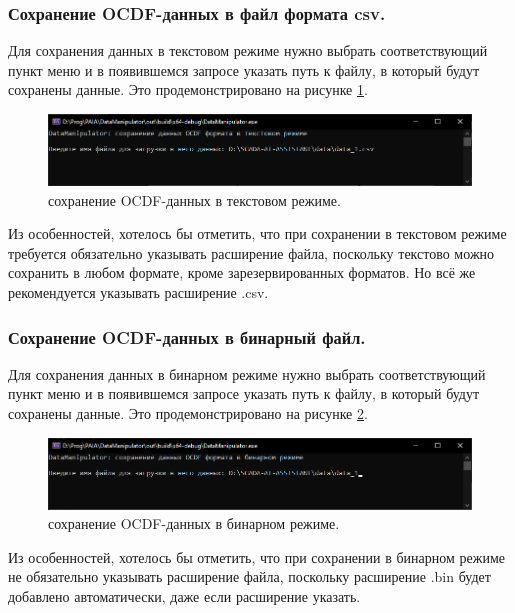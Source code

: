 \subsubsection{ \standartTitleFont
  Сохранение OCDF-данных в файл формата csv.
} \label{subsubsec:OCDFSafeCSV}

{\standartFont

  \par Для сохранения данных в текстовом режиме нужно выбрать соответствующий пункт меню и в появившемся запросе указать путь к файлу, в который будут сохранены данные. Это продемонстрировано на рисунке \ref{fig:OCDFsafeCSV}.

  \begin{figure}[H]
    \centering
    \includegraphics[width=\textwidth]{images/forDataManipulator/OCDFsafeCSV.png}
    \caption{сохранение OCDF-данных в текстовом режиме.}
    \label{fig:OCDFsafeCSV}
  \end{figure}

  \par Из особенностей, хотелось бы отметить, что при сохранении в текстовом режиме требуется обязательно указывать расширение файла, поскольку текстово можно сохранить в любом формате, кроме зарезервированных форматов. Но всё же рекомендуется указывать расширение .csv.
}

\subsubsection{ \standartTitleFont
  Сохранение OCDF-данных в бинарный файл.
} \label{subsubsec:OCDFSafeBIN}

{\standartFont

  \par Для сохранения данных в бинарном режиме нужно выбрать соответствующий пункт меню и в появившемся запросе указать путь к файлу, в который будут сохранены данные. Это продемонстрировано на рисунке \ref{fig:OCDFsafeBIN}.

  \begin{figure}[H]
    \centering
    \includegraphics[width=\textwidth]{images/forDataManipulator/OCDFsafeBIN.png}
    \caption{сохранение OCDF-данных в бинарном режиме.} 
    \label{fig:OCDFsafeBIN}
  \end{figure}

  \par Из особенностей, хотелось бы отметить, что при сохранении в бинарном режиме не обязательно указывать расширение файла, поскольку расширение .bin будет добавлено автоматически, даже если расширение указать. 
}

